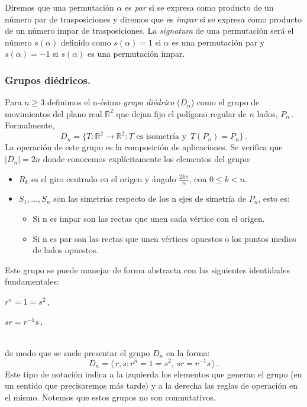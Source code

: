 \begin{ndef}
Diremos que una permutación $\alpha$ es \textit{par} si se expresa como producto de un número par de trasposiciones y diremos que es \textit{impar} si se expresa como producto de un número impar de trasposiciones. La \textit{signatura} de una permutación será el número $s(\alpha)$ definido como $s(\alpha) = 1$ si $\alpha$ es una permutación par y $s(\alpha) = -1$ si $s(\alpha)$ es una permutación impar.
\end{ndef}

\subsubsection{Grupos diédricos.}

Para $n \ge 3$ definimos el n-ésimo \textit{grupo diédrico} ($D_n$) como el grupo de movimientos del plano real $\mathbb{R}^2$ que dejan fijo el polígono regular de $n$ lados, $P_n$\,. Formalmente, \begin{equation*}
  D_n = \{T:\mathbb{R}^2 \to \mathbb{R}^2 : T \text{ es isometría y } \,  T(P_n) = P_n\}\,.
\end{equation*} La operación de este grupo es la composición de aplicaciones. Se verifica que $|D_n| = 2n$ donde conocemos explícitamente los elementos del grupo:
\begin{itemize}
  \item $R_k$ es el giro centrado en el origen y ángulo $\frac{2k\pi}{n}$, con $0 \le k < n$.
  \item $S_1,...,S_n$ son las simetrías respecto de los n ejes de simetría de $P_n$, esto es: \begin{itemize}
    \item Si n es impar son las rectas que unen cada vértice con el origen.
    \item Si n es par son las rectas que unen vértices opuestos o los puntos medios de lados opuestos.
  \end{itemize}
\end{itemize}
  
Este grupo se puede manejar de forma abstracta con las siguientes identidades fundamentales:

\begin{itemize*}[label=,itemjoin=\hspace{2em},before=\hspace{\zadlen}]
  \item $r^n = 1 = s^2$\,,
  \item $sr = r^{-1}s$\,,
\end{itemize*}\\
de modo que se suele presentar el grupo $D_n$ en la forma: \begin{equation*}
  D_n = \langle\, r,s : r^n = 1 = s^2,\,sr = r^{-1}s\,\rangle\,.

\end{equation*} Este tipo de notación indica a la izquierda los elementos que generan el grupo (en un sentido que precisaremos más tarde) y a la derecha las reglas de operación en el mismo. Notemos que estos grupos no son conmutativos.

